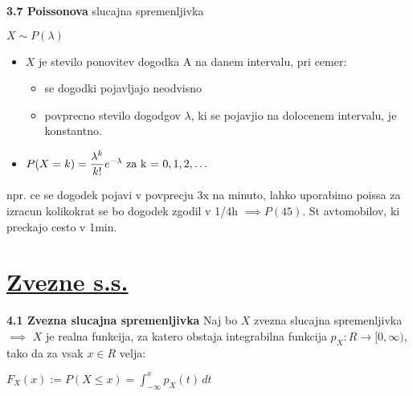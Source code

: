 \documentclass{article}
\begin{document}
\begin{multicols}{2}
\textbf{3.7 Poissonova} slucajna spremenljivka
\begin{center}
    \begin{math}
        X \sim P(\lambda)
    \end{math}
\end{center}
\begin{itemize}
    \item $X$ je stevilo ponovitev dogodka A na danem intervalu, pri cemer:
        \begin{itemize}
            \item se dogodki pojavljajo neodvisno
            \item povprecno stevilo dogodgov $\lambda$, ki se pojavjio na dolocenem intervalu, je konstantno.
        \end{itemize}
    \item \begin{math}
        P(X = k) =  \dfrac{ \lambda^{k} }{k!} e^{- \lambda}$ za k = $ 0,1,2,\dots
    \end{math}
\end{itemize}
npr. ce se dogodek pojavi v povprecju 3x na minuto, lahko uporabimo poissa za izracun
kolikokrat se bo dogodek zgodil v  1/4h $\implies P(45)$. St avtomobilov, ki preckajo cesto v 1min.

\section{\underline{Zvezne s.s.}}

\textbf{4.1 Zvezna slucajna spremenljivka}
Naj bo $X$ zvezna slucajna spremenljivka $\implies$ $X$ je realna funkcija,
za katero obstaja integrabilna funkcija $p_{X}: R \rightarrow [0, \infty)$,
tako da za vsak $x \in R$ velja:

\begin{center}
    \begin{math}
        F_{X}(x) := P(X \leq x) = \int_{- \infty}^{x} p_{X}(t) \,dt
    \end{math}
\end{center}


\end{multicols}
\end{document}
